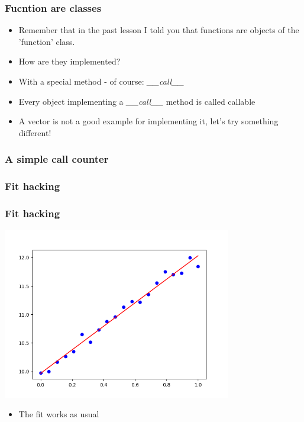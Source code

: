 \documentclass[9pt]{beamer}
\begin{document}
\begin{frame}
  \frametitle{Fucntion are classes}
  
  \begin{itemize}
    \item Remember that in the past lesson I told you that functions are objects
          of the 'function' class.
    \medskip
    \item How are they implemented?
    \medskip
    \item With a special method - of course: \emph{\_\_call\_\_}
    \medskip
    \item Every object implementing a \emph{\_\_call\_\_} method is called \alert{callable}
    \medskip
    \item A vector is not a good example for implementing it, let's try something
          different!
  \end{itemize}
  
\end{frame}


\begin{frame}
  \frametitle{A simple call counter}
  
\end{frame}


\begin{frame}
  \frametitle{Fit hacking}
  
\end{frame}


\begin{frame}
  \frametitle{Fit hacking}
  \centering
  \includegraphics[width=0.75\textwidth]{fit_with_custom_callable.png}
  
  \medskip
  
  \begin{itemize}
    \item The fit works as usual
   \end{itemize}  
\end{frame}
\end{document}
